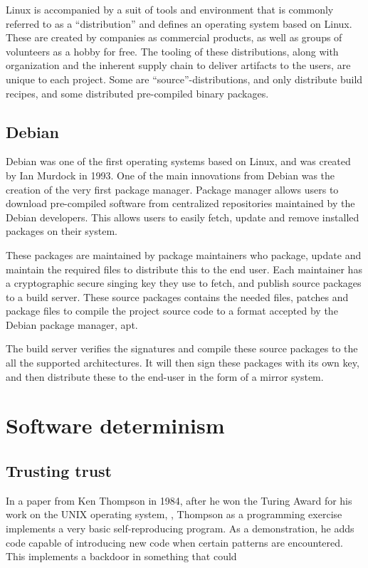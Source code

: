\documentclass[../Main/thesis.tex]{subfiles}
\begin{document}
Linux is accompanied by a suit of tools and environment that is commonly
referred to as a ``distribution'' and defines an operating system based on
Linux. These are created by companies as commercial products, as well as groups
of volunteers as a hobby for free. The tooling of these distributions, along
with organization and the inherent supply chain to deliver artifacts to the
users, are unique to each project. Some are ``source''-distributions, and only
distribute build recipes, and some distributed pre-compiled binary packages.

\subsection*{Debian}
Debian was one of the first operating systems based on Linux, and was created by
Ian Murdock in 1993. One of the main innovations from Debian was the creation of
the very first package manager. Package manager allows users to download
pre-compiled software from centralized repositories maintained by the Debian
developers. This allows users to easily fetch, update and remove installed
packages on their system.

These packages are maintained by package maintainers who package, update and
maintain the required files to distribute this to the end user. Each maintainer
has a cryptographic secure singing key they use to fetch, and publish source
packages to a build server. These source packages contains the needed files,
patches and package files to compile the project source code to a format
accepted by the Debian package manager, apt.

The build server verifies the signatures and compile these source packages to
the all the supported architectures. It will then sign these packages with its
own key, and then distribute these to the end-user in the form of a mirror
system.


\section{Software determinism}\label{sec:reproducible_builds}


\subsection*{Trusting trust}
In a paper from Ken Thompson in 1984, after he won the Turing Award for his work
on the UNIX operating system, ,
Thompson as a programming exercise implements a very basic self-reproducing
program. As a demonstration, he adds code capable of introducing new code when
certain patterns are encountered. This implements a backdoor in something that
could
\end{document}
